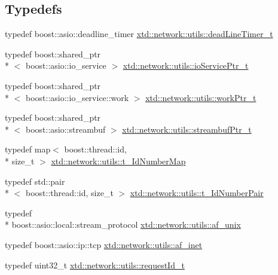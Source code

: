 \subsection*{Typedefs}
\begin{DoxyCompactItemize}
\item 
typedef boost\-::asio\-::deadline\-\_\-timer \hyperlink{namespacextd_1_1network_1_1utils_af551b4a44731a154a57b9447dac595cd}{xtd\-::network\-::utils\-::dead\-Line\-Timer\-\_\-t}
\item 
typedef boost\-::shared\-\_\-ptr\\*
$<$ boost\-::asio\-::io\-\_\-service $>$ \hyperlink{namespacextd_1_1network_1_1utils_a67dfba91438896976d636d5aea36c848}{xtd\-::network\-::utils\-::io\-Service\-Ptr\-\_\-t}
\item 
typedef boost\-::shared\-\_\-ptr\\*
$<$ boost\-::asio\-::io\-\_\-service\-::work $>$ \hyperlink{namespacextd_1_1network_1_1utils_a9e0bae7b0da2b42ca8930a927f3a7c4d}{xtd\-::network\-::utils\-::work\-Ptr\-\_\-t}
\item 
typedef boost\-::shared\-\_\-ptr\\*
$<$ boost\-::asio\-::streambuf $>$ \hyperlink{namespacextd_1_1network_1_1utils_aaaf1b50be1864a40d85efd18979631e1}{xtd\-::network\-::utils\-::streambuf\-Ptr\-\_\-t}
\item 
typedef map$<$ boost\-::thread\-::id, \\*
size\-\_\-t $>$ \hyperlink{namespacextd_1_1network_1_1utils_a778bf7884b2296561ffc1fc5a5f14e38}{xtd\-::network\-::utils\-::t\-\_\-\-Id\-Number\-Map}
\item 
typedef std\-::pair\\*
$<$ boost\-::thread\-::id, size\-\_\-t $>$ \hyperlink{namespacextd_1_1network_1_1utils_aa6bd02256b6023347de116a773dd9500}{xtd\-::network\-::utils\-::t\-\_\-\-Id\-Number\-Pair}
\item 
typedef \\*
boost\-::asio\-::local\-::stream\-\_\-protocol \hyperlink{namespacextd_1_1network_1_1utils_a60e83921a2d026f07b49fa094988acdf}{xtd\-::network\-::utils\-::af\-\_\-unix}
\item 
typedef boost\-::asio\-::ip\-::tcp \hyperlink{namespacextd_1_1network_1_1utils_a6238bab7a616eda8c9424721444a18d1}{xtd\-::network\-::utils\-::af\-\_\-inet}
\item 
typedef uint32\-\_\-t \hyperlink{namespacextd_1_1network_1_1utils_a0bdb4094852a77df867e219999175200}{xtd\-::network\-::utils\-::request\-Id\-\_\-t}
\item 

\end{DoxyCompactItemize}
